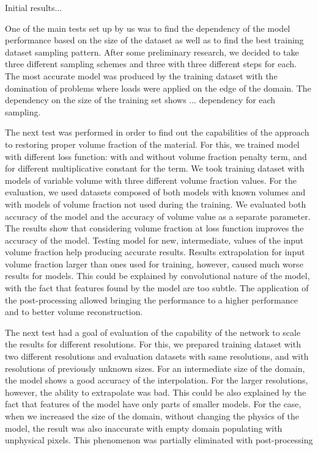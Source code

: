 
Initial results...
\medskip

One of the main tests set up by us was to find the dependency of the model performance based on the size of the dataset as well as to find the best training dataset sampling pattern.
After some preliminary research, we decided to take three different sampling schemes and three with three different steps for each. 
The most accurate model was produced by the training dataset with the domination of problems where loads were applied on the edge of the domain.
The dependency on the size of the training set shows ...  dependency for each sampling.
\medskip

The next test was performed in order to find out the capabilities of the approach to restoring proper volume fraction of the material. 
For this, we trained model with different loss function: with and without volume fraction penalty term, and for different multiplicative constant for the term.
We took training dataset with models of variable volume with three different volume fraction values.
For the evaluation, we used datasets composed of both models with known volumes and with models of volume fraction not used during the training.
We evaluated both accuracy of the model and the accuracy of volume value as a separate parameter.
The results show that considering volume fraction at loss function improves the accuracy of the model. 
Testing model for new, intermediate, values of the input volume fraction help producing accurate results.
Results extrapolation for input volume fraction larger than ones used for training, however, caused much worse results for models. 
This could be explained by convolutional nature of the model, with the fact that features found by the model are too subtle.  
The application of the post-processing allowed bringing the performance to a higher performance and to better volume reconstruction. 
\medskip 

The next test had a goal of evaluation of the capability of the network to scale the results for different resolutions.
For this, we prepared training dataset with two different resolutions and evaluation datasets with same resolutions, and with resolutions of previously unknown sizes.
For an intermediate size of the domain, the model shows a good accuracy of the interpolation.
For the larger resolutions, however, the ability to extrapolate was bad.
This could be also explained by the fact that features of the model have only parts of smaller models.
For the case, when we increased the size of the domain, without changing the physics of the model, the result was also inaccurate with empty domain populating with unphysical pixels.
This phenomenon was partially eliminated with post-processing
\medskip

